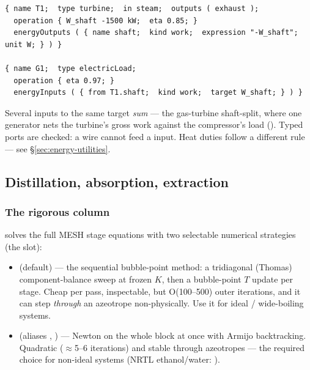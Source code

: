 \documentclass[11pt,a4paper]{article}
\begin{document}
\begin{lstlisting}[language=dict]
{ name T1;  type turbine;  in steam;  outputs ( exhaust );
  operation { W_shaft -1500 kW;  eta 0.85; }
  energyOutputs ( { name shaft;  kind work;  expression "-W_shaft";  unit W; } ) }

{ name G1;  type electricLoad;
  operation { eta 0.97; }
  energyInputs ( { from T1.shaft;  kind work;  target W_shaft; } ) }
\end{lstlisting}

Several inputs to the same target \emph{sum} --- the gas-turbine
shaft-split, where one generator nets the turbine's gross work against
the compressor's load
().
Typed ports are checked: a  wire cannot feed a 
input.  Heat duties follow a different rule --- see
\S\ref{sec:energy-utilities}.

\subsection{Distillation, absorption, extraction}\label{sec:columns}

\subsubsection{The rigorous column}

 solves the full MESH stage equations with two
selectable numerical strategies (the  slot):

\begin{itemize}[leftmargin=*,nosep,topsep=2pt]
\item {} (default) --- the sequential bubble-point method:
      a tridiagonal (Thomas) component-balance sweep at frozen $K$,
      then a bubble-point $T$ update per stage.  Cheap per pass,
      inspectable, but O(100--500) outer iterations, and it can step
      \emph{through} an azeotrope non-physically.  Use it for ideal /
      wide-boiling systems.
\item {} (aliases ,
      ) --- Newton on the whole block at once
      with Armijo backtracking.  Quadratic ($\approx$5--6 iterations)
      and stable through azeotropes --- the required choice for
      non-ideal systems (NRTL ethanol/water:
      ).
\end{itemize}
\end{document}
